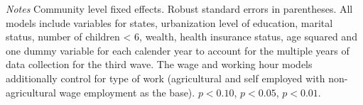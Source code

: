 \documentclass[12pt,english]{article}
\begin{document}
\begin{table}[h]
\begin{center}
\begin{adjustbox}{max width=\linewidth}
\begin{threeparttable}
{\begin{tablenotes}
\item \footnotesize \textit{Notes} Community level fixed effects. Robust standard errors in parentheses. All models include variables for  states, urbanization level of education, marital status, number of children < 6, wealth, health insurance status, age squared and one dummy variable for each calender year to account for the multiple years of data collection for the third wave. The wage and working hour models additionally control for type of work (agricultural and self employed with non-agricultural wage employment as the base). \sym{*} \(p<0.10\), \sym{**} \(p<0.05\), \sym{***} \(p<0.01\).
\end{tablenotes}
}
\end{threeparttable}
\end{adjustbox}
\end{center}
\end{table}
\end{document}
